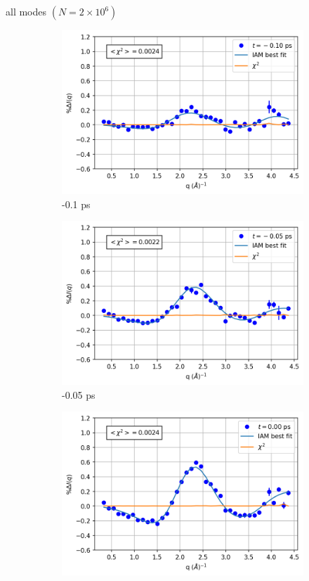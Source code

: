 \documentclass{beamer}
\newcommand\w{0.32}
\begin{document}
\begin{frame}{all modes $(N= 2\times10^6)$}
	\begin{figure}
		\centering
		\begin{subfigure}[b]{\w\textwidth}
			\centering
			\includegraphics[width=\textwidth]{figures/1000000_allmodes_-0.10.png}
			\caption{-0.1 ps}
		\end{subfigure}
		\begin{subfigure}[b]{\w\textwidth}
			\centering
			\includegraphics[width=\textwidth]{figures/1000000_allmodes_-0.05.png}
			\caption{-0.05 ps}
		\end{subfigure}
		\begin{subfigure}[b]{\w\textwidth}
			\centering
			\includegraphics[width=\textwidth]{figures/1000000_allmodes_0.00.png}

\end{subfigure}
\end{figure}
\end{frame}
\end{document}
